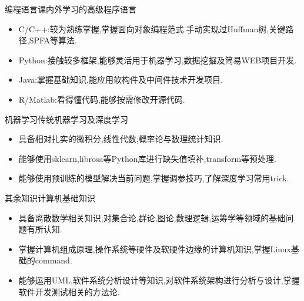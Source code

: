 \par{\quad{}}
\begin{experiences}
  \experience
    {编程语言}{课内外学习的高级程序语言}{
          \begin{itemize}
            \item C/C++:较为熟练掌握,掌握面向对象编程范式.手动实现过Huffman树,关键路径,SPFA等算法.
            \item Python:接触较多框架,能够灵活用于机器学习,数据挖掘及简易WEB项目开发.
            \item Java:掌握基础知识,能应用软构件及中间件技术开发项目.
            \item R/Matlab:看得懂代码,能够按需修改开源代码.
          \end{itemize}}
  \emptySeparator
  \experience
  {机器学习}{传统机器学习及深度学习}{
  	\begin{itemize}
  		\item 具备相对扎实的微积分,线性代数,概率论与数理统计知识.
  		\item 能够使用sklearn,librosa等Python库进行缺失值填补,transform等预处理.
  		\item 能够使用预训练的模型解决当前问题,掌握调参技巧,了解深度学习常用trick.
  \end{itemize}}
  \emptySeparator
  \experience
  {其余知识}{计算机基础知识}{
  	\begin{itemize}
  		\item 具备离散数学相关知识,对集合论,群论,图论,数理逻辑,运筹学等领域的基础问题有所认知.
  		\item 掌握计算机组成原理,操作系统等硬件及软硬件边缘的计算机知识,掌握Linux基础的command.
  		\item 能够运用UML,软件系统分析设计等知识,对软件系统架构进行分析与设计,掌握软件开发测试相关的方法论.
  \end{itemize}}
  \emptySeparator
\end{experiences}
